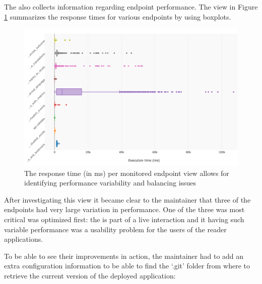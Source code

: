 \documentclass[conference]{IEEEtran}
\begin{document}
  The \tool also collects information regarding endpoint performance. The view in Figure \ref{fig:ep} summarizes the response times for various endpoints by using boxplots. 


  \begin{figure}[h!]
    \centering
    \includegraphics[width=\linewidth]{endpoint_performance.png}
    \caption{The response time (in ms) per monitored endpoint view allows for identifying performance variability and balancing issues}
    \label{fig:ep}
  \end{figure}

  After investigating this view it became clear to the maintainer that three of the endpoints had very large variation in performance. One of the three was most critical was optimized first: the \epTranslations is part of a live interaction and it having such variable performance was a usability problem for the users of the reader applications. 


  \niceseparator

  To be able to see their improvements in action, the maintainer had to add an extra configuration information to be able to find the `.git' folder from where to retrieve the current version of the deployed application: 
\end{document}
